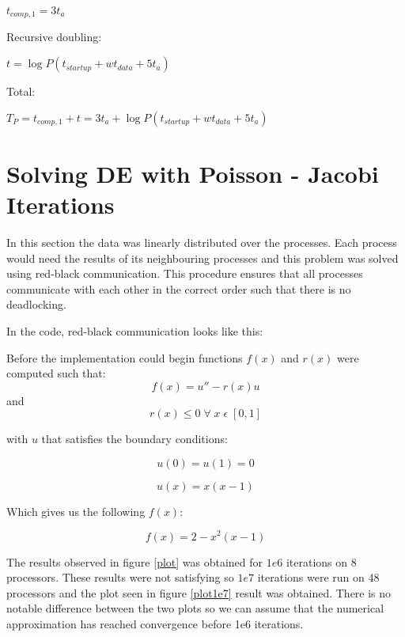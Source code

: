 \documentclass[a4paper]{exam}
\begin{document}
\begin{questions}
$t_{comp,1} = 3t_a$

Recursive doubling:

$t = \log P(t_{startup} + wt_{data} + 5t_a)$

Total:

$T_P = t_{comp,1} + t = 3t_a +\log P(t_{startup} + wt_{data} + 5 t_a) $

\section{Solving DE with Poisson - Jacobi Iterations}

In this section the data was linearly distributed over the processes. Each process would need the results of its neighbouring processes and this problem was solved using red-black communication. This procedure ensures that all processes communicate with each other in the correct order such that there is no deadlocking.

In the code, red-black communication looks like this:



Before the implementation could begin functions $f(x)$ and $r(x)$ were computed such that:
\begin{equation}
  f(x) = u'' - r(x)u
\end{equation}
and
\begin{equation}
  r(x) \leq 0 \; \forall \; x \; \epsilon \; [0,1]
\end{equation}

with $u$ that satisfies the boundary conditions:

\begin{equation}
  u(0) = u(1) = 0
\end{equation}

\begin{equation*}
  u(x) = x(x-1)
\end{equation*}

Which gives us the following $f(x)$:

\begin{equation}
  f(x) = 2 - x^2(x-1)
\end{equation}

The results observed in figure \ref{plot} was obtained for $1e6$ iterations on 8 processors. These results were not satisfying so $1e7$ iterations were run on 48 processors and the plot seen in figure \ref{plot1e7} result was obtained. There is no notable difference between the two plots so we can assume that the numerical approximation has reached convergence before 1e6 iterations. 


\end{questions}
\end{document}
